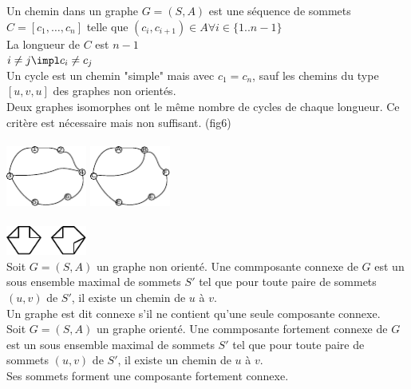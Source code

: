  Un chemin dans un graphe $G=(S,A)$ est une séquence de sommets $C = [ c_1,\ldots,c_n ]$ telle que $(c_i,c_{i+1}) \in A \forall i \in \{ 1 .. n-1 \}$ \\
 
 La longueur de $C$ est $n-1$ \\

 $i\neq j \impl c_i \neq c_j$ \\

 Un cycle est un chemin "simple" mais avec $c_1 = c_n$, sauf les chemins du type $[u,v,u]$ des graphes non orientés. \\

 Deux graphes isomorphes ont le même nombre de cycles de chaque longueur. Ce critère est nécessaire mais non suffisant. (fig6)\\

 \\
\includegraphics[width=100px]{Images/fig4.pdf} \hspace{1cm} \includegraphics[width=100px]{Images/fig5.pdf} \\

 \\
\includegraphics[width=100px]{Images/fig6.pdf} \\

 Soit $G=(S,A)$ un graphe non orienté. Une commposante connexe de $G$ est un sous ensemble maximal de sommets $S'$ tel que pour toute paire de sommets $(u,v)$ de $S'$, il existe un chemin de $u$ à $v$. \\

 Un graphe est dit connexe s'il ne contient qu'une seule composante connexe. \\

 Soit $G=(S,A)$ un graphe orienté. Une commposante fortement connexe de $G$ est un sous ensemble maximal de sommets $S'$ tel que pour toute paire de sommets $(u,v)$ de $S'$, il existe un chemin de $u$ à $v$. \\

 Ses sommets forment une composante fortement connexe. \\

